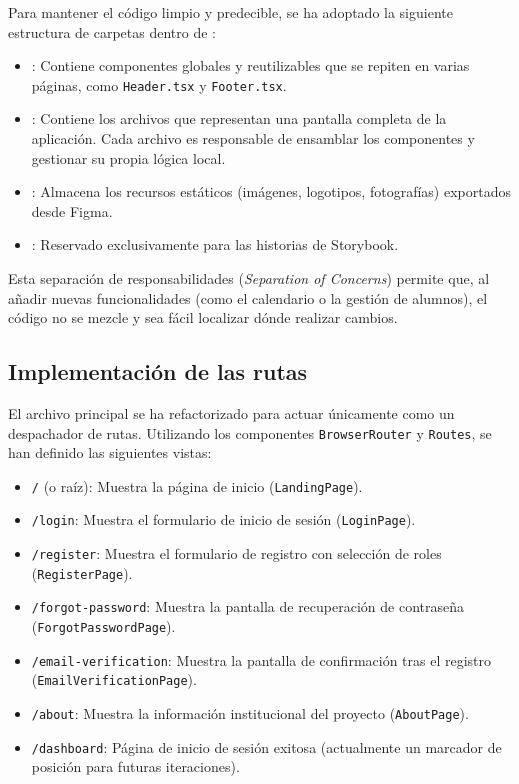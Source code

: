 \documentclass[12pt,a4paper]{report}
\begin{document}
Para mantener el código limpio y predecible, se ha adoptado la siguiente estructura de carpetas dentro de :

\begin{itemize}
    \item {}: Contiene componentes globales y reutilizables que se repiten en varias páginas, como \texttt{Header.tsx} y \texttt{Footer.tsx}.
    \item {}: Contiene los archivos que representan una pantalla completa de la aplicación. Cada archivo es responsable de ensamblar los componentes y gestionar su propia lógica local.
    \item {}: Almacena los recursos estáticos (imágenes, logotipos, fotografías) exportados desde Figma.
    \item {}: Reservado exclusivamente para las historias de Storybook.
\end{itemize}

Esta separación de responsabilidades (\textit{Separation of Concerns}) permite que, al añadir nuevas funcionalidades (como el calendario o la gestión de alumnos), el código no se mezcle y sea fácil localizar dónde realizar cambios.

\subsection{Implementación de las rutas}

El archivo principal  se ha refactorizado para actuar únicamente como un despachador de rutas. Utilizando los componentes \texttt{BrowserRouter} y \texttt{Routes}, se han definido las siguientes vistas:

\begin{itemize}
    \item \texttt{/} (o raíz): Muestra la página de inicio (\texttt{LandingPage}).
    \item \texttt{/login}: Muestra el formulario de inicio de sesión (\texttt{LoginPage}).
    \item \texttt{/register}: Muestra el formulario de registro con selección de roles (\texttt{RegisterPage}).
    \item \texttt{/forgot-password}: Muestra la pantalla de recuperación de contraseña (\texttt{ForgotPasswordPage}).
    \item \texttt{/email-verification}: Muestra la pantalla de confirmación tras el registro (\texttt{EmailVerificationPage}).
    \item \texttt{/about}: Muestra la información institucional del proyecto (\texttt{AboutPage}).
    \item \texttt{/dashboard}: Página de inicio de sesión exitosa (actualmente un marcador de posición para futuras iteraciones).
\end{itemize}
\end{document}
